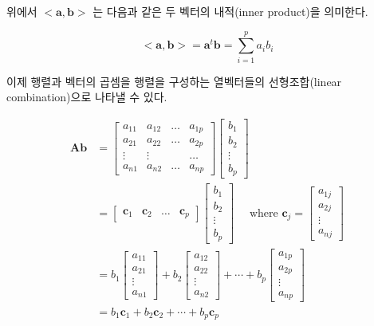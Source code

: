 \documentclass[
  11pt,
  a4paper,
  oneside]{scrbook}
\theoremstyle{definition}
\theoremstyle{plain}
\theoremstyle{definition}
\theoremstyle{definition}
\theoremstyle{remark}
\begin{document}
위에서 \(< \pmb a, \pmb b>\) 는 다음과 같은 두 벡터의 내적(inner
product)을 의미한다.

\[ < \pmb a, \pmb b> = {\pmb a}^t {\pmb b} = \sum_{i=1}^p a_i b_i \]

이제 행렬과 벡터의 곱셈을 행렬을 구성하는 열벡터들의 선형조합(linear
combination)으로 나타낼 수 있다.

\[
\begin{align}
{\pmb A} {\pmb b} & = 
\begin{bmatrix}
a_{11} & a_{12} & \dots & a_{1p} \\
a_{21} & a_{22} & \dots & a_{2p} \\
\vdots & \vdots &    & \dots \\
a_{n1} & a_{n2} & \dots & a_{np} 
\end{bmatrix}
\begin{bmatrix}
b_1 \\
b_2 \\
\vdots \\
b_p 
\end{bmatrix} \\
& = 
\begin{bmatrix}
{\pmb c}_1 & {\pmb c}_2 & \dots & {\pmb c}_p 
\end{bmatrix} 
\begin{bmatrix}
b_1 \\
b_2 \\
\vdots \\
b_p 
\end{bmatrix} 
\quad 
\text{ where }
{\pmb c}_j =
\begin{bmatrix}
a_{1j} \\
a_{2j} \\
\vdots \\
a_{nj} 
\end{bmatrix} \\
& =
b_1 
\begin{bmatrix}
a_{11} \\
a_{21} \\
\vdots \\
a_{n1} 
\end{bmatrix} 
+ 
b_2 
\begin{bmatrix}
a_{12} \\
a_{22} \\
\vdots \\
a_{n2} 
\end{bmatrix} 
+ \cdots + 
b_p 
\begin{bmatrix}
a_{1p} \\
a_{2p} \\
\vdots \\
a_{np} 
\end{bmatrix}  \\
& =
b_1 {\pmb c}_1 + b_2 {\pmb c}_2 + \cdots + b_p {\pmb c}_p \\
\end{align}
\]
\end{document}

